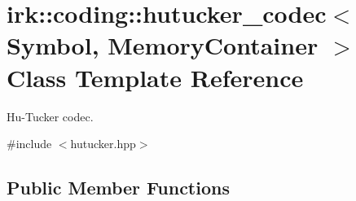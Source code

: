 \hypertarget{classirk_1_1coding_1_1hutucker__codec}{}\section{irk\+:\+:coding\+:\+:hutucker\+\_\+codec$<$ Symbol, Memory\+Container $>$ Class Template Reference}
\label{classirk_1_1coding_1_1hutucker__codec}


Hu-\/\+Tucker codec.  




{\ttfamily \#include $<$hutucker.\+hpp$>$}

\subsection*{Public Member Functions}
